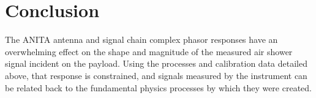 \section{Conclusion}
	The ANITA antenna and signal chain complex phasor responses have an overwhelming effect on the shape and magnitude of the measured air shower signal incident on the payload.  Using the processes and calibration data detailed above, that response is constrained, and signals measured by the instrument can be related back to the fundamental physics processes by which they were created.
	
